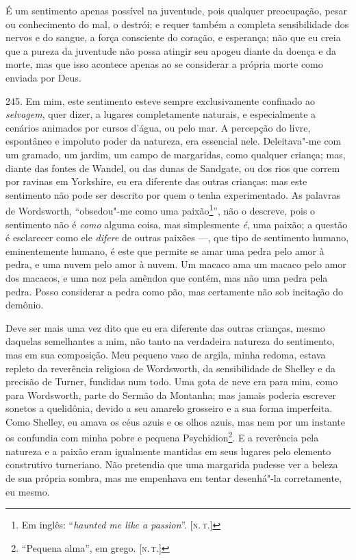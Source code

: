 É um sentimento apenas possível na juventude, pois qualquer preocupação,
pesar ou conhecimento do mal, o destrói; e requer também a completa
sensibilidade dos nervos e do sangue, a força consciente do coração, e
esperança; não que eu creia que a pureza da juventude não possa atingir
seu apogeu diante da doença e da morte, mas que isso acontece apenas ao
se considerar a própria morte como enviada por Deus.

245. Em mim, este sentimento esteve sempre exclusivamente confinado ao
\emph{selvagem}, quer dizer, a lugares completamente naturais, e
especialmente a cenários animados por cursos d'água, ou pelo mar. A
percepção do livre, espontâneo e impoluto poder da natureza, era
essencial nele. Deleitava"-me com um gramado, um jardim, um campo de
margaridas, como qualquer criança; mas, diante das fontes de Wandel, ou
das dunas de Sandgate, ou dos rios que correm por ravinas em Yorkshire,
eu era diferente das outras crianças: mas este sentimento não pode ser
descrito por quem o tenha experimentado. As palavras de Wordsworth,
``obsedou"-me como uma paixão\footnote{Em inglês: ``\emph{haunted me like
  a passion}''. {[}\textsc{n.\,t.}{]}}'', não o descreve, pois o sentimento não
é \emph{como} alguma coisa, mas simplesmente \emph{é}, uma paixão; a
questão é esclarecer como ele \emph{difere} de outras paixões ---, que
tipo de sentimento humano, eminentemente humano, é este que permite se
amar uma pedra pelo amor à pedra, e uma nuvem pelo amor à nuvem. Um
macaco ama um macaco pelo amor dos macacos, e uma noz pela amêndoa que
contém, mas não uma pedra pela pedra. Posso considerar a pedra como pão,
mas certamente não sob incitação do demônio.

Deve ser mais uma vez dito que eu era diferente das outras crianças,
mesmo daquelas semelhantes a mim, não tanto na verdadeira natureza do
sentimento, mas em sua composição. Meu pequeno vaso de argila, minha
redoma, estava repleto da reverência religiosa de Wordsworth, da
sensibilidade de Shelley e da precisão de Turner, fundidas num todo. Uma
gota de neve era para mim, como para Wordsworth, parte do Sermão da
Montanha; mas jamais poderia escrever sonetos a quelidônia, devido a seu
amarelo grosseiro e a sua forma imperfeita. Como Shelley, eu amava os
céus azuis e os olhos azuis, mas nem por um instante os confundia com
minha pobre e pequena Psychidion\footnote{``Pequena alma'', em grego.
  {[}\textsc{n.\,t.}{]}}. E a reverência pela natureza e a paixão eram
igualmente mantidas em seus lugares pelo elemento construtivo
turneriano. Não pretendia que uma margarida pudesse ver a beleza de sua
própria sombra, mas me empenhava em tentar desenhá"-la corretamente, eu
mesmo.

